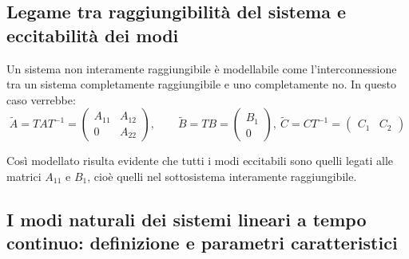 \documentclass{article}
\begin{document}
\subsection{Legame tra raggiungibilità del sistema e eccitabilità dei modi}

Un sistema non interamente raggiungibile è modellabile come l'interconnessione tra un sistema
completamente raggiungibile e uno completamente no.
In questo caso verrebbe: 
\[
\widetilde{A} = TAT^{-1}= \begin{pmatrix}
A_{11} & A_{12}\\
0 & A_{22}
\end{pmatrix}
,
\hspace{2em}
\widetilde{B} = TB = \begin{pmatrix}
B_1\\
0
\end{pmatrix},\ 
\widetilde{C}= CT^{-1} = \begin{pmatrix}
C_1 & C_2
\end{pmatrix}
\]

Così modellato risulta evidente che tutti i modi eccitabili sono quelli legati alle matrici $A_{11}$ e $B_1$,
cioè quelli nel sottosistema interamente raggiungibile.


\subsection{I modi naturali dei sistemi lineari a tempo continuo: definizione e parametri caratteristici}
\end{document}
